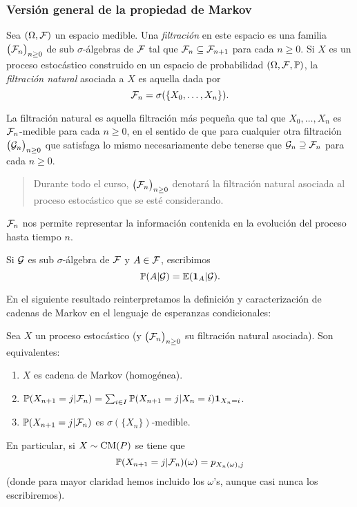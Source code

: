 \subsubsection{Versión general de la propiedad de Markov}

\begin{defn}
Sea $(\Omega,\mathcal{F})$ un espacio medible.
Una \emph{filtración} en este espacio es una familia $\big(\mathcal{F}_n\big)_{n\geq0}$ de sub $\sigma$-álgebras de $\mathcal{F}$ tal que $\mathcal{F}_n\subseteq\mathcal{F}_{n+1}$ para cada $n\geq0$.
\lsep
Si $X$ es un proceso estocástico construido en un espacio de probabilidad $(\Omega,\mathcal{F},\mathbb{P})$, la \emph{filtración natural} asociada a $X$ es aquella dada por
\[\mathcal{F}_n=\sigma(\{X_0,\dotsc,X_n\}).\]
\end{defn}

La filtración natural es aquella filtración más pequeña que tal que $X_0,\dotsc,X_n$ es $\mathcal{F}_n$-medible para cada $n\geq0$, en el sentido de que para cualquier otra filtración $\big(\mathcal{G}_n\big)_{n\geq0}$ que satisfaga lo mismo necesariamente debe tenerse que $\mathcal{G}_n\supseteq\mathcal{F}_n$ para cada $n\geq0$.
\begin{quote}
Durante todo el curso, $\big(\mathcal{F}_n\big)_{n\geq0}$ denotará la filtración natural asociada al proceso estocástico que se esté considerando.
\end{quote}
\lsep
$\mathcal{F}_n$ nos permite representar la información contenida en la evolución del proceso hasta tiempo $n$.

\begin{notation}
Si $\mathcal{G}$ es sub $\sigma$-álgebra de $\mathcal{F}$ y $A\in\mathcal{F}$, escribimos 
\[\mathbb{P}(A|\mathcal{G})=\mathbb{E}(\mathbf{1}_{A}|\mathcal{G}).\]
\end{notation}

En el siguiente resultado reinterpretamos la definición y caracterización de cadenas de Markov en el lenguaje de esperanzas condicionales:

\begin{prop}
Sea $X$ un proceso estocástico (y $\big(\mathcal{F}_n\big)_{n\geq0}$ su filtración natural asociada).
Son equivalentes:
\begin{enumerate}[label=\uptext{(\roman*)}]
\item $X$ es cadena de Markov (homogénea).
\item $\mathbb{P}(X_{n+1}=j|\mathcal{F}_n)=\sum_{i\in I}\mathbb{P}(X_{n+1}=j|X_n=i)\mathbf{1}_{X_n=i}$.
\item $\mathbb{P}(X_{n+1}=j|\mathcal{F}_n)$ es $\sigma(\{X_n\})$-medible.
\end{enumerate}	
En particular, si $X\sim\text{\upshape{CM}}(P)$ se tiene que
\[\mathbb{P}(X_{n+1}=j|\mathcal{F}_n)(\omega)=p_{X_n(\omega),j}\]
(donde para mayor claridad hemos incluido los $\omega$'s, aunque casi nunca los escribiremos).
\end{prop}

